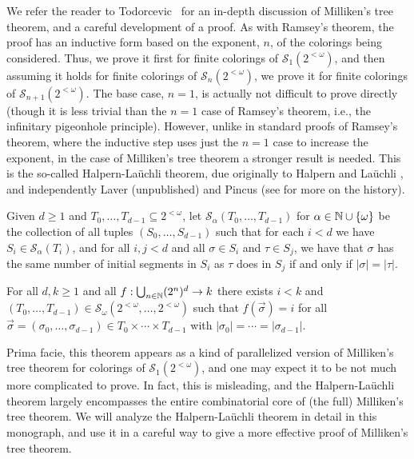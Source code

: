 We refer the reader to Todorcevic~\cite[Chapter 6]{Todorcevic2010Ramsey} for an in-depth discussion of Milliken's tree theorem, and a careful development of a proof. As with Ramsey's theorem, the proof has an inductive form based on the exponent, $n$, of the colorings being considered. Thus, we prove it first for finite colorings of $\mathcal{S}_1(2^{<\omega})$, and then assuming it holds for finite colorings of $\mathcal{S}_n(2^{<\omega})$, we prove it for finite colorings of $\mathcal{S}_{n+1}(2^{<\omega})$. The base case, $n = 1$, is actually not difficult to prove directly (though it is less trivial than the $n = 1$ case of Ramsey's theorem, i.e., the infinitary pigeonhole principle). However, unlike in standard proofs of Ramsey's theorem, where the inductive step uses just the $n = 1$ case to increase the exponent, in the case of Milliken's tree theorem a stronger result is needed. This is the so-called Halpern-La\"{u}chli theorem, due originally to Halpern and La\"{u}chli \cite{HalperbLauchli1966}, and independently Laver (unpublished) and Pincus \cite{Pincus1974} (see \cite{Pincus1981} for more on the history).

Given $d \geq 1$ and $T_0,\ldots,T_{d-1} \subseteq 2^{<\omega}$, let $\mathcal{S}_\alpha(T_0,\ldots,T_{d-1})$ for $\alpha \in \mathbb{N} \cup \{\omega\}$ be the collection of all tuples $(S_0,\ldots,S_{d-1})$ such that for each $i < d$ we have $S_i \in \mathcal{S}_\alpha(T_i)$, and for all $i,j < d$ and all $\sigma \in S_i$ and $\tau \in S_j$, we have that $\sigma$ has the same number of initial segments in $S_i$ as $\tau$ does in $S_j$ if and only if $|\sigma| = |\tau|$.

\begin{theorem}
	For all $d,k \geq 1$ and all $f: \bigcup_{n \in \mathbb{N}} (2^n)^d \to k$ there exists $i < k$ and $(T_0,\ldots,T_{d-1}) \in \mathcal{S}_\omega(2^{<\omega},\ldots,2^{<\omega})$ such that $f(\vec{\sigma})=i$ for all $\vec{\sigma} = (\sigma_0,\ldots,\sigma_{d-1}) \in T_0 \times \cdots \times T_{d-1}$ with $|\sigma_0| = \cdots = |\sigma_{d-1}|$.
\end{theorem}

\noindent Prima facie, this theorem appears as a kind of parallelized version of Milliken's tree theorem for colorings of $\mathcal{S}_1(2^{<\omega})$, and one may expect it to be not much more complicated to prove. In fact, this is misleading, and the Halpern-La\"{u}chli theorem largely encompasses the entire combinatorial core of (the full) Milliken's tree theorem. We will analyze the Halpern-La\"{u}chli theorem in detail in this monograph, and use it in a careful way to give a more effective proof of Milliken's tree theorem.

